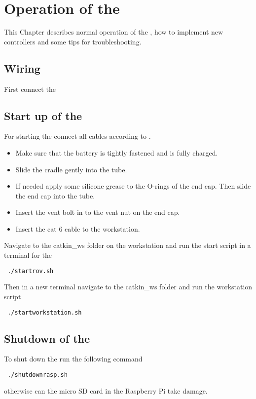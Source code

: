 \chapter{Operation of the \abbrROV} \label{app:operation}
This Chapter describes normal operation of the \abbrROV, how to implement new controllers and some tips for troubleshooting.

\section{Wiring} \label{sec:wiring}
First connect the 
\section{Start up of the \abbrROV}
For starting the \abbrROV connect all cables according to .
\begin{itemize}
	\item Make sure that the battery is tightly fastened and is fully charged. 
	\item Slide the cradle gently into the \abbrROV tube. 
	\item If needed apply some silicone grease to the O-rings of the end cap. Then slide the end cap into the \abbrROV tube.
	\item Insert the vent bolt in to the vent nut on the end cap.
	\item Insert the cat 6 cable to the workstation.
 \end{itemize} 
Navigate to the catkin\_ws folder on the workstation and run the start script in a terminal for the \abbrROV
\begin{lstlisting}
 ./startrov.sh
\end{lstlisting}
Then in a new terminal navigate to the catkin\_ws folder and run the workstation script
\begin{lstlisting}
 ./startworkstation.sh
\end{lstlisting} 
\section{Shutdown of the \abbrROV}
To shut down the \abbrROV run the following command
\begin{lstlisting}
 ./shutdownrasp.sh
\end{lstlisting}
otherwise can the micro SD card in the Raspberry Pi take damage.
